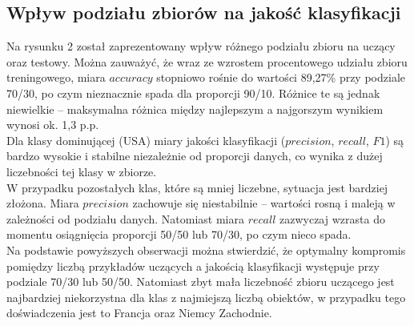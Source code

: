 \documentclass{article}
\begin{document}
\subsection{Wpływ podziału zbiorów na jakość klasyfikacji}
Na rysunku 2 został zaprezentowany wpływ różnego podziału zbioru na uczący oraz testowy. Można zauważyć, że wraz ze wzrostem procentowego udziału zbioru treningowego, miara \(accuracy\) stopniowo rośnie do wartości 89{,}27\% przy podziale 70/30, po czym nieznacznie spada dla proporcji 90/10. Różnice te są jednak niewielkie – maksymalna różnica między najlepszym a najgorszym wynikiem wynosi ok. 1,3 p.p. \\
Dla klasy dominującej (USA) miary jakości klasyfikacji (\(precision\), \(recall\), \(F1\)) są bardzo wysokie i stabilne niezależnie od proporcji danych, co wynika z dużej liczebności tej klasy w zbiorze. \\
W przypadku pozostałych klas, które są mniej liczebne, sytuacja jest bardziej złożona. Miara \(precision\) zachowuje się niestabilnie – wartości rosną i maleją w zależności od podziału danych. Natomiast miara \(recall\) zazwyczaj wzrasta do momentu osiągnięcia proporcji 50/50 lub 70/30, po czym nieco spada. \\
Na podstawie powyższych obserwacji można stwierdzić, że optymalny kompromis pomiędzy liczbą przykładów uczących a jakością klasyfikacji występuje przy podziale 70/30 lub 50/50. Natomiast zbyt mała liczebność zbioru uczącego jest najbardziej niekorzystna dla klas z najmiejszą liczbą obiektów, w przypadku tego doświadczenia jest to Francja oraz Niemcy Zachodnie.
\end{document}
